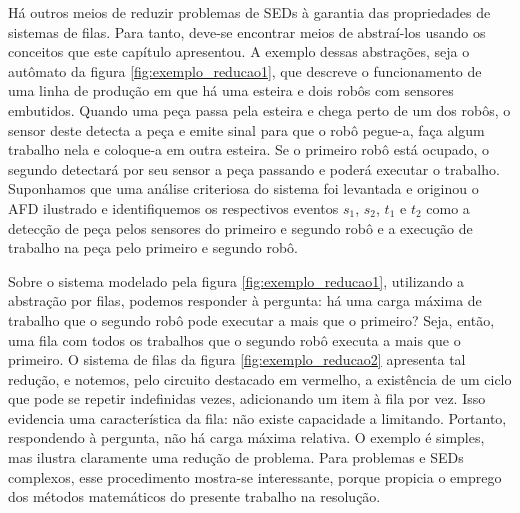 Há outros meios de reduzir problemas de SEDs à garantia das propriedades de sistemas de filas. Para tanto, deve-se encontrar meios de abstraí-los usando os conceitos que este capítulo apresentou. A exemplo dessas abstrações, seja o autômato da figura \ref{fig:exemplo_reducao1}, que descreve o funcionamento de uma linha de produção em que há uma esteira e dois robôs com sensores embutidos. Quando uma peça passa pela esteira e chega perto de um dos robôs, o sensor deste detecta a peça e emite sinal para que o robô pegue-a, faça algum trabalho nela e coloque-a em outra esteira. Se o primeiro robô está ocupado, o segundo detectará por seu sensor a peça passando e poderá executar o trabalho. Suponhamos que uma análise criteriosa do sistema foi levantada e originou o AFD ilustrado e identifiquemos os respectivos eventos $s_1$, $s_2$, $t_1$ e $t_2$ como a detecção de peça pelos sensores do primeiro e segundo robô e a execução de trabalho na peça pelo primeiro e segundo robô.


Sobre o sistema modelado pela figura \ref{fig:exemplo_reducao1}, utilizando a abstração por filas, podemos responder à pergunta: há uma carga máxima de trabalho que o segundo robô pode executar a mais que o primeiro? Seja, então, uma fila com todos os trabalhos que o segundo robô executa a mais que o primeiro. O sistema de filas da figura \ref{fig:exemplo_reducao2} apresenta tal redução, e notemos, pelo circuito destacado em vermelho, a existência de um ciclo que pode se repetir indefinidas vezes, adicionando um item à fila por vez. Isso evidencia uma característica da fila: não existe capacidade a limitando. Portanto, respondendo à pergunta, não há carga máxima relativa. O exemplo é simples, mas ilustra claramente uma redução de problema. Para problemas e SEDs complexos, esse procedimento mostra-se interessante, porque propicia o emprego dos métodos matemáticos do presente trabalho na resolução.

